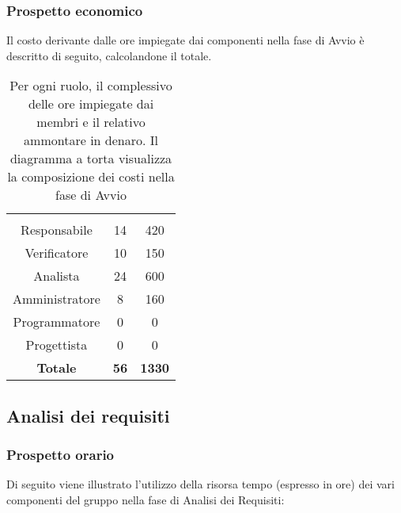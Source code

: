 \subsubsection{Prospetto economico}
Il costo derivante dalle ore impiegate dai componenti nella fase di Avvio è descritto di seguito, calcolandone il totale.

\begin{table}[H]
{\setlength{\parindent}{0cm}
\begin{minipage}{.43\textwidth}
	\begin{tabular}{ccc}
	\rowcolorhead
	\headertitle{Ruolo} & \headertitle{Ore} & \headertitle{Costo(€)}\\
	Responsabile & 14 & 420\\
	Verificatore & 10 & 150\\
	Analista & 24 & 600\\
	Amministratore & 8 & 160\\
	Programmatore & 0 & 0\\
	Progettista & 0 & 0\\
	\hline
	\textbf{Totale} & \textbf{56} & \textbf{1330}\\
	\end{tabular}
\end{minipage}%
\begin{minipage}{.57\textwidth}
\end{minipage} }
\caption[Prospetto economico della fase di Avvio]{Per ogni ruolo, il complessivo delle ore impiegate dai membri e il relativo ammontare in denaro. Il diagramma a torta visualizza la composizione dei costi nella fase di Avvio}
\end{table}



\subsection{Analisi dei requisiti}

\subsubsection{Prospetto orario}
Di seguito viene illustrato l'utilizzo della risorsa tempo (espresso in ore) dei vari componenti del gruppo nella fase di Analisi dei Requisiti:

